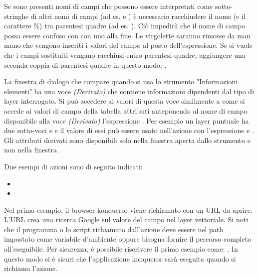 Se sono presenti nomi di campi che possono essere interpretati come
sotto-stringhe di altri nomi di campi (ad es.  e
) è necessario racchiudere il nome (e il
carattere \%) tra parentesi quadre (ad es. \usertext{[\%col10]}). Ciò impedirà
che il nome di campo  possa essere confuso con
 con uno  alla fine. Le virgolette saranno
rimosse da \qg man mano che vengono inseriti i valori del campo al posto
dell'espressione. Se si vuole che i campi sostituiti vengano racchiusi entro
parentesi quadre, aggiungere una seconda coppia di parentesi quadre in questo
modo: \usertext{[[\%col10]]}.

La finestra di dialogo  che compare quando si
usa lo strumento "Informazioni elementi" ha una voce {\em (Derivato)} che
contiene informazioni dipendenti dal tipo di layer interrogato. Si
può accedere ai valori di questa voce similmente a come si accede ai valori
di campo della tabella attributi anteponendo al nome di campo disponibile alla
voce {\em (Derivato)} l'espressione . Per esempio un
layer puntuale ha due sotto-voci  e  e il valore di
essi può essere usato nell'azione con l'espressione 
e . Gli attributi derivati sono disponibili solo nella
finestra  aperta dallo strumento 
 e non nella finestra 
.

Due esempi di azioni sono di seguito indicati:

\begin{itemize}
  \item {}
  \item {}
\end{itemize}

Nel primo esempio, il browser konqueror viene richiamato con un URL da
aprire. L'URL crea una ricerca Google sul valore del campo  nel
layer vettoriale. Si noti che il programma o lo script richiamato dall'azione
deve essere nel path impostato come variabile d'ambiente oppure bisogna
fornire il percorso completo all'eseguibile. Per sicurezza, è possibile
riscrivere il primo esempio come: . In questo modo si è sicuri che
l'applicazione konqueror sarà eseguita quando si richiama l'azione.

